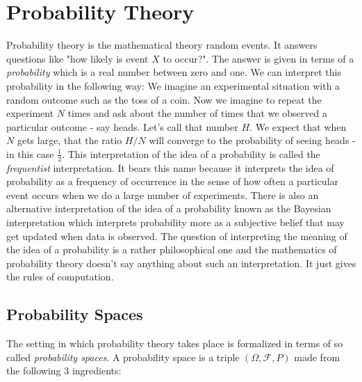 \section{Probability Theory}
Probability theory is the mathematical theory random events. It answers questions like "how likely is event $X$ to occur?". The answer is given in terms of a \emph{probability} which is a real number between zero and one. We can interpret this probability in the following way: We imagine an experimental situation with a random outcome such as the toss of a coin. Now we imagine to repeat the experiment $N$ times and ask about the number of times that we observed a particular outcome - say heads. Let's call that number $H$. We expect that when $N$ gets large, that the ratio $H/N$ will converge to the probability of seeing heads - in this case $\frac{1}{2}$. This interpretation of the idea of a probability is called the \emph{frequentist} interpretation. It bears this name because it interprets the idea of probability as a frequency of occurrence in the sense of how often a particular event occurs when we do a large number of experiments. There is also an alternative interpretation of the idea of a probability known as the Bayesian interpretation which interprets probability more as a subjective belief that may get updated when data is observed. The question of interpreting the meaning of the idea of a probability is a rather philosophical one and the mathematics of probability theory doesn't say anything about such an interpretation. It just gives the rules of computation.  



\subsection{Probability Spaces}
The setting in which probability theory takes place is formalized in terms of so called \emph{probability spaces}. A probability space is a triple $(\Omega, \mathcal{F}, P)$ made from the following 3 ingredients: 

